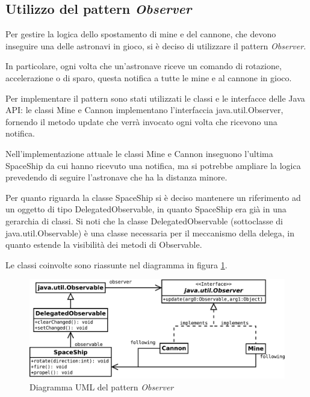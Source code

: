\documentclass[a4paper,12pt]{article}
\begin{document}
\subsection{Utilizzo del pattern \emph{Observer}}

Per gestire la logica dello spostamento di mine e del cannone, che devono inseguire una delle astronavi in gioco, si \`e deciso di utilizzare il pattern \emph{Observer}.

In particolare, ogni volta che un'astronave riceve un comando di rotazione, accelerazione o di sparo, questa notifica a tutte le mine e al cannone in gioco.

Per implementare il pattern sono stati utilizzati le classi e le interfacce delle Java API: le classi \textsf{Mine} e \textsf{Cannon} implementano l'interfaccia \textsf{java.util.Observer}, fornendo il metodo \textsf{update} che verr\`a invocato ogni volta che ricevono una notifica.

Nell'implementazione attuale le classi \textsf{Mine} e \textsf{Cannon} inseguono l'ultima \textsf{SpaceShip} da cui hanno ricevuto una notifica, ma si potrebbe ampliare la logica prevedendo di seguire l'astronave che ha la distanza minore.

Per quanto riguarda la classe \textsf{SpaceShip} si \`e deciso mantenere un riferimento ad un oggetto di tipo \textsf{DelegatedObservable}, in quanto \textsf{SpaceShip} era gi\`a in una gerarchia di classi. Si noti che la classe \textsf{DelegatedObservable} (sottoclasse di \textsf{java.util.Observable}) \`e una classe necessaria per il meccanismo della delega, in quanto estende la visibilit\`a dei metodi di \textsf{Observable}.

Le classi coinvolte sono riassunte nel diagramma in figura \ref{img:Observer}.

\begin{figure}[ht]
\centering
\includegraphics[width=14cm]{Observer.pdf}
\caption{Diagramma UML del pattern \emph{Observer}}
\label{img:Observer}
\end{figure}
\end{document}
